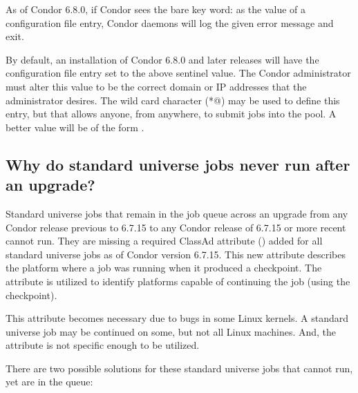 As of Condor 6.8.0, if 
Condor sees the bare key word: 
as the value of a configuration file entry,
Condor daemons will log the given error message and exit.

By default, an installation of Condor 6.8.0 and later releases
will have the
configuration file entry  set to the above sentinel
value. 
The Condor administrator must alter this value to be the correct domain
or IP addresses that the administrator desires.
The wild card character (\verb@*@) may be used to define this entry,
but that allows anyone, from anywhere,
to submit jobs into the pool.
A better value will be of the form .

\subsection*{Why do standard universe jobs never run after an upgrade?}
\label{sec:checkpoint-platform-faq}

Standard universe jobs that remain in the job queue across an upgrade
from any Condor release previous to 6.7.15
to any Condor release of 6.7.15 or more recent
cannot run.
They are missing a required ClassAd attribute
() added for
all standard universe jobs as of Condor version 6.7.15.
This new attribute describes the platform where a job was
running when it produced a checkpoint.
The attribute is utilized to identify platforms capable of 
continuing the job (using the checkpoint).

This attribute becomes necessary due to bugs in some Linux kernels.
A standard universe job may be continued on some, but not all
Linux machines.
And, the  attribute is not specific enough
to be utilized.

There are two possible solutions for these standard universe jobs that
cannot run, yet are in the queue:

